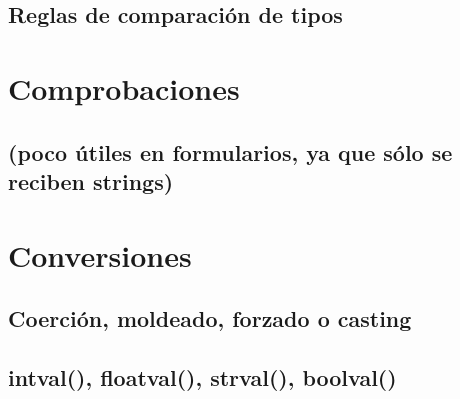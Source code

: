 \documentclass[a4paper,11pt,spanish]{sphinxmanual}
\begin{document}
\subsection{Reglas de comparación de tipos}
\label{\detokenize{conceptos-basicos-de-php:reglas-de-comparacion-de-tipos}}

\section{Comprobaciones}
\label{\detokenize{conceptos-basicos-de-php:comprobaciones}}

\subsection{}
\label{\detokenize{conceptos-basicos-de-php:gettype}}

\subsection{ (poco útiles en formularios, ya que sólo se reciben strings)}
\label{\detokenize{conceptos-basicos-de-php:is-poco-utiles-en-formularios-ya-que-solo-se-reciben-strings}}

\subsection{}
\label{\detokenize{conceptos-basicos-de-php:is-numeric}}

\subsection{}
\label{\detokenize{conceptos-basicos-de-php:ctype}}

\section{Conversiones}
\label{\detokenize{conceptos-basicos-de-php:conversiones}}

\subsection{Coerción, moldeado, forzado o casting}
\label{\detokenize{conceptos-basicos-de-php:coercion-moldeado-forzado-o-casting}}

\subsection{intval(), floatval(), strval(), boolval()}
\label{\detokenize{conceptos-basicos-de-php:intval-floatval-strval-boolval}}
\end{document}
